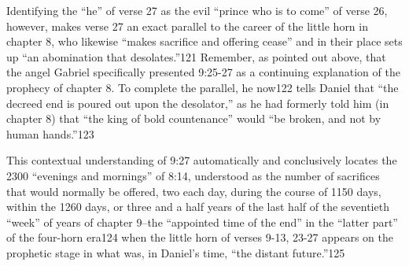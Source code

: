 Identifying the ``he'' of verse 27 as the evil ``prince who is to come'' of
verse 26, however, makes verse 27 an exact parallel to the career of the
little horn in chapter 8, who likewise ``makes sacrifice and offering cease''
and in their place sets up ``an abomination that desolates.''121 Remember, as
pointed out above, that the angel Gabriel specifically presented 9:25-27 as
a continuing explanation of the prophecy of chapter 8. To complete the
parallel, he now122 tells Daniel that ``the decreed end is poured out upon
the desolator,'' as he had formerly told him (in chapter 8) that ``the king of
bold countenance'' would ``be broken, and not by human hands.''123

This contextual understanding of 9:27 automatically and conclusively locates
the 2300 ``evenings and mornings'' of 8:14, understood as the number of
sacrifices that would normally be offered, two each day, during the course
of 1150 days, within the 1260 days, or three and a half years of the last
half of the seventieth ``week'' of years of chapter 9--the ``appointed time of
the end'' in the ``latter part'' of the four-horn era124 when the little horn
of verses 9-13, 23-27 appears on the prophetic stage in what was, in
Daniel's time, ``the distant future.''125
